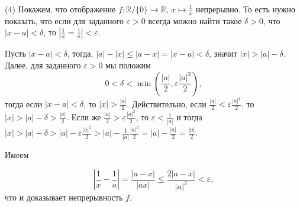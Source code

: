 (4) Покажем, что отображение $f:\mathbb{R}/\{0\} \to \mathbb{R}$, $x \mapsto \frac{1}{x}$ непрерывно. То есть нужно показать, что если для заданного $\varepsilon>0$ всегда можно найти такое $\delta>0$, что $|x-a|<\delta$, то $|\frac{1}{x} = \frac{1}{a}|<\varepsilon.$

Пусть $|x-a|<\delta$, тогда, $|a| - |x| \le |a-x| = |x-a| < \delta$, значит $|x|>|a| -\delta$. Далее, для заданного $\varepsilon>0$ мы положим 
\[
0<\delta < \min \left( \frac{|a|}{2}, \varepsilon\frac{|a|^2}{2} \right),
\]
тогда если $|x-a|< \delta$, то $|x|>\frac{|a|}{2}$. Действительно, если $\frac{|a|}{2}< \varepsilon\frac{|a|^2}{2}$, то $|x| > |a| - \delta > \frac{|a|}{2}$. Если же $\frac{|a|}{2}> \varepsilon\frac{|a|^2}{2}$, то $\varepsilon < \frac{1}{|a|}$ и тогда $|x|  > |a| - \delta > |a| -\varepsilon \frac{|a|^2}{2} > |a| -  \frac{1}{|a|}\frac{|a|^2}{2} = |a| - \frac{|a|}{2} = \frac{|a|}{2}.$

Имеем

\[
 \left| \frac{1}{x} - \frac{1}{a} \right| = \frac{|a-x|}{|ax|} \le \frac{2 |a-x|}{|a|^2} < \varepsilon,
\]
что и доказывает непрерывность $f$.


